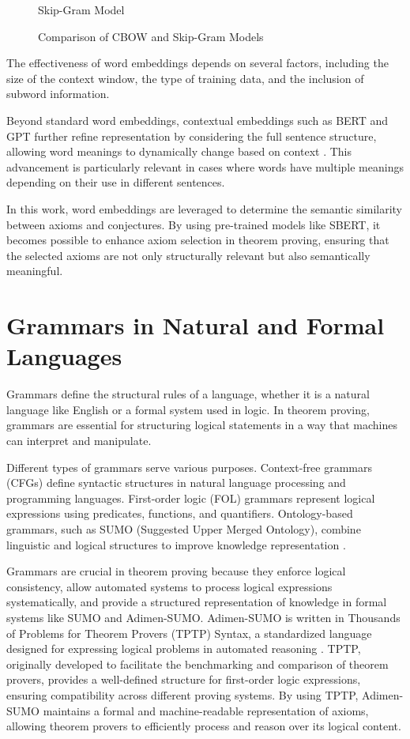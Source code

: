 \documentclass[english,version-2020-11]{uzl-thesis}
\begin{document}
\begin{figure}[h]
\begin{subcaptionblock}{0.45\textwidth}
        \caption{Skip-Gram Model}
    \end{subcaptionblock}
    \caption{Comparison of CBOW and Skip-Gram Models}
\end{figure}


The effectiveness of word embeddings depends on several factors, including the size of the context window, the type of training data, and the inclusion of subword information.

Beyond standard word embeddings, contextual embeddings such as BERT and GPT further refine representation by considering the full sentence structure, allowing word meanings to dynamically change based on context \cite{Devlin2019}. This advancement is particularly relevant in cases where words have multiple meanings depending on their use in different sentences.

In this work, word embeddings are leveraged to determine the semantic similarity between axioms and conjectures. By using pre-trained models like SBERT, it becomes possible to enhance axiom selection in theorem proving, ensuring that the selected axioms are not only structurally relevant but also semantically meaningful.

\section{Grammars in Natural and Formal Languages}

Grammars define the structural rules of a language, whether it is a natural language like English or a formal system used in logic. In theorem proving, grammars are essential for structuring logical statements in a way that machines can interpret and manipulate.

Different types of grammars serve various purposes. Context-free grammars (CFGs) define syntactic structures in natural language processing and programming languages. First-order logic (FOL) grammars represent logical expressions using predicates, functions, and quantifiers. Ontology-based grammars, such as SUMO (Suggested Upper Merged Ontology), combine linguistic and logical structures to improve knowledge representation \cite{Niles2001}.

Grammars are crucial in theorem proving because they enforce logical consistency, allow automated systems to process logical expressions systematically, and provide a structured representation of knowledge in formal systems like SUMO and Adimen-SUMO. Adimen-SUMO is written in Thousands of Problems for Theorem Provers (TPTP) Syntax, a standardized language designed for expressing logical problems in automated reasoning \cite{Alvez2014}. TPTP, originally developed to facilitate the benchmarking and comparison of theorem provers, provides a well-defined structure for first-order logic expressions, ensuring compatibility across different proving systems. By using TPTP, Adimen-SUMO maintains a formal and machine-readable representation of axioms, allowing theorem provers to efficiently process and reason over its logical content.
\end{document}
